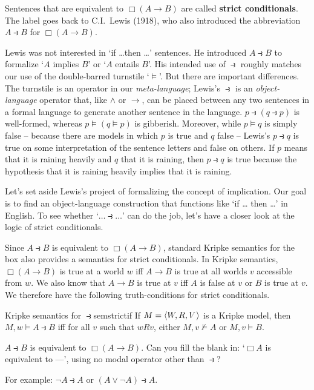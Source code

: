 Sentences that are equivalent to $\Box(A \to B)$ are called \textbf{strict
  conditionals}. The label goes back to C.I.\ Lewis (1918), who also introduced
the abbreviation $A \strictif B$ for $\Box(A \to B)$.

Lewis was not interested in `if \ldots then \ldots' sentences. He introduced
$A \strictif B$ to formalize `$A$ implies $B$' or `$A$ entails $B$'. His
intended use of $\strictif$ roughly matches our use of the double-barred
turnstile `$\models$'. But there are important differences. The turnstile is an
operator in our \emph{meta-language}; Lewis's $\strictif$ is an
\emph{object-language} operator that, like $\land$ or $\to$, can be placed
between any two sentences in a formal language to generate another sentence in
the language. $p \strictif (q \strictif p)$ is well-formed, whereas
$p \models (q\models p)$ is gibberish. Moreover, while $p \models q$ is simply
false -- because there are models in which $p$ is true and $q$ false -- Lewis's
$p \strictif q$ is true on some interpretation of the sentence letters and false
on others. If $p$ means that it is raining heavily and $q$ that it is raining, then
$p \strictif q$ is true because the hypothesis that it is raining heavily
implies that it is raining.

Let's set aside Lewis's project of formalizing the concept of implication. Our
goal is to find an object-language construction that functions like `if \ldots
then \ldots' in English. To see whether `$\ldots \strictif\ldots$' can do the job,
let's have a closer look at the logic of strict conditionals.

Since $A \strictif B$ is equivalent to $\Box(A \to B)$, standard Kripke
semantics for the box also provides a semantics for strict conditionals. In
Kripke semantics, $\Box(A \to B)$ is true at a world $w$ iff $A \to B$ is true
at all worlds $v$ accessible from $w$. We also know that $A \to B$ is true at
$v$ iff $A$ is false at $v$ or $B$ is true at $v$. We therefore have the
following truth-conditions for strict conditionals.

\begin{definition}{Kripke semantics for $\strictif$}{semstrictif}
  If $M = \t{W,R,V}$ is a Kripke model, then\\[1mm]
  $M,w \models A \strictif B$ iff for all $v$ such that $wRv$, either
  $M,v \not\models A$ or $M,v \models B$.
\end{definition}

\begin{exercise}
  $A \strictif B$ is equivalent to $\Box(A \to B)$. Can you fill the blank in:
  `$\Box A$ is equivalent to ---', using no modal operator other than
  $\strictif$?
\end{exercise}
\begin{solution}
  For example: $\neg A \strictif A$ or $(A\lor \neg A) \strictif A$.
\end{solution}

